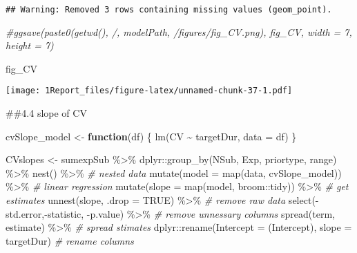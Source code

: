 \documentclass[
]{article}
\newenvironment{Shaded}{\begin{snugshade}}{\end{snugshade}}
\newcommand{\AttributeTok}[1]{\textcolor[rgb]{0.77,0.63,0.00}{#1}}
\newcommand{\CommentTok}[1]{\textcolor[rgb]{0.56,0.35,0.01}{\textit{#1}}}
\newcommand{\ConstantTok}[1]{\textcolor[rgb]{0.00,0.00,0.00}{#1}}
\newcommand{\ControlFlowTok}[1]{\textcolor[rgb]{0.13,0.29,0.53}{\textbf{#1}}}
\newcommand{\FunctionTok}[1]{\textcolor[rgb]{0.00,0.00,0.00}{#1}}
\newcommand{\NormalTok}[1]{#1}
\newcommand{\OtherTok}[1]{\textcolor[rgb]{0.56,0.35,0.01}{#1}}
\newcommand{\SpecialCharTok}[1]{\textcolor[rgb]{0.00,0.00,0.00}{#1}}
\newcommand{\StringTok}[1]{\textcolor[rgb]{0.31,0.60,0.02}{#1}}
\begin{document}
\begin{verbatim}
## Warning: Removed 3 rows containing missing values (geom_point).
\end{verbatim}

\begin{Shaded}
\begin{Highlighting}[]
\CommentTok{\#ggsave(paste0(getwd(), \textquotesingle{}/\textquotesingle{}, modelPath, \textquotesingle{}/figures/fig\_CV.png\textquotesingle{}), fig\_CV, width = 7, height = 7)}

\NormalTok{fig\_CV}
\end{Highlighting}
\end{Shaded}

\texttt{[image: 1Report\_files/figure-latex/unnamed-chunk-37-1.pdf]}

\#\#4.4 slope of CV

\begin{Shaded}
\begin{Highlighting}[]
\NormalTok{cvSlope\_model }\OtherTok{\textless{}{-}} \ControlFlowTok{function}\NormalTok{(df) \{}
  \FunctionTok{lm}\NormalTok{(CV }\SpecialCharTok{\textasciitilde{}}\NormalTok{ targetDur, }\AttributeTok{data =}\NormalTok{ df)}
\NormalTok{\}}

\NormalTok{CVslopes }\OtherTok{\textless{}{-}}\NormalTok{ sumexpSub }\SpecialCharTok{\%\textgreater{}\%} 
\NormalTok{  dplyr}\SpecialCharTok{::}\FunctionTok{group\_by}\NormalTok{(NSub, Exp, priortype, range) }\SpecialCharTok{\%\textgreater{}\%} \FunctionTok{nest}\NormalTok{()  }\SpecialCharTok{\%\textgreater{}\%}  \CommentTok{\# nested data}
  \FunctionTok{mutate}\NormalTok{(}\AttributeTok{model =} \FunctionTok{map}\NormalTok{(data, cvSlope\_model)) }\SpecialCharTok{\%\textgreater{}\%}  \CommentTok{\# linear regression}
  \FunctionTok{mutate}\NormalTok{(}\AttributeTok{slope =} \FunctionTok{map}\NormalTok{(model, broom}\SpecialCharTok{::}\NormalTok{tidy)) }\SpecialCharTok{\%\textgreater{}\%}  \CommentTok{\# get estimates}
  \FunctionTok{unnest}\NormalTok{(slope, }\AttributeTok{.drop =} \ConstantTok{TRUE}\NormalTok{) }\SpecialCharTok{\%\textgreater{}\%} \CommentTok{\# remove raw data}
  \FunctionTok{select}\NormalTok{(}\SpecialCharTok{{-}}\NormalTok{std.error,}\SpecialCharTok{{-}}\NormalTok{statistic, }\SpecialCharTok{{-}}\NormalTok{p.value) }\SpecialCharTok{\%\textgreater{}\%}  \CommentTok{\# remove unnessary columns}
  \FunctionTok{spread}\NormalTok{(term, estimate) }\SpecialCharTok{\%\textgreater{}\%}   \CommentTok{\# spread stimates}
\NormalTok{  dplyr}\SpecialCharTok{::}\FunctionTok{rename}\NormalTok{(}\AttributeTok{Intercept =} \StringTok{\textasciigrave{}}\AttributeTok{(Intercept)}\StringTok{\textasciigrave{}}\NormalTok{, }\AttributeTok{slope =}\NormalTok{ targetDur)  }\CommentTok{\# rename columns}
\end{Highlighting}
\end{Shaded}
\end{document}
